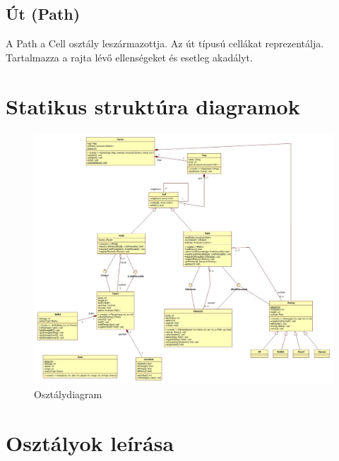 \subsection{Út (Path)}
A Path a Cell osztály leszármazottja. Az út típusú cellákat reprezentálja. Tartalmazza a rajta lévő ellenségeket és esetleg akadályt.


\section{Statikus struktúra diagramok}

\begin{figure}[h]
\begin{center}
\includegraphics[width=17cm]{chapters/chapter03/images/Main.jpg}
\caption{Osztálydiagram}
\label{fig:Osztálydiagram}
\end{center}
\end{figure}


\section{Osztályok leírása}

